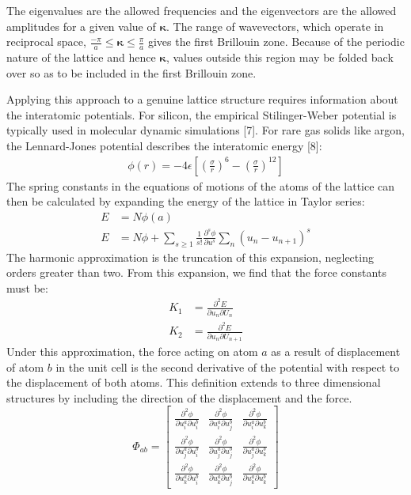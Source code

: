 \documentclass{article}
\numberwithin{equation}{section}
\begin{document}
The eigenvalues are the allowed frequencies and the eigenvectors are the allowed amplitudes for a given value of $\pmb{\kappa}$. The range of wavevectors, which operate in reciprocal space,  $\frac{-\pi}{a}\leq \pmb{\kappa}\leq\frac{\pi}{a}$ gives the first Brillouin zone. Because of the periodic nature of the lattice and hence $\pmb{\kappa}$, values outside this region may be folded back over so as to be included in the first Brillouin zone.

Applying this approach to a genuine lattice structure requires information about the interatomic potentials. For silicon, the empirical Stilinger-Weber potential is typically used in molecular dynamic simulations [7]. For rare gas solids like argon, the Lennard-Jones potential describes the interatomic energy [8]:
\begin{align*}
	\phi(r)=-4\epsilon[(\frac{\sigma}{r})^6-(\frac{\sigma}{r})^{12}]	
\end{align*}
The spring constants in the equations of motions of the atoms of the lattice can then be calculated by expanding the energy of the lattice in Taylor series:
\begin{align*}
	E&=N\phi(a)\\
	E&=N\phi+\sum_{s\geq1}\frac{1}{s!}\frac{\partial^s\phi}{\partial u^s}\sum_n(u_n-u_{n+1})^s
\end{align*}
The harmonic approximation is the truncation of this expansion, neglecting orders greater than two. From this expansion, we find that the force constants must be:
\begin{align*}
	K_1&=\frac{\partial^2 E}{\partial u_n\partial U_{n}}\\
	K_2&=\frac{\partial^2 E}{\partial u_n\partial U_{n+1}}
\end{align*}
Under this approximation, the force acting on atom $a$ as a result of displacement of atom $b$ in the unit cell is the second derivative of the potential with respect to the displacement of both atoms. This definition extends to three dimensional structures by including the direction of the displacement and the force.
\[ 
\Phi_{ab}=
\begin{bmatrix}
  \frac{\partial^2 \phi}{\partial u^a_i\partial u^b_i} & \frac{\partial^2 \phi}{\partial u^a_i\partial u^b_j} &\frac{\partial^2 \phi}{\partial u^a_i\partial u^b_k}\\
  \frac{\partial^2 \phi}{\partial u^a_j\partial u^b_i} & \frac{\partial^2 \phi}{\partial u^a_j\partial u^b_j} &\frac{\partial^2 \phi}{\partial u^a_j\partial u^b_k}\\
\frac{\partial^2 \phi}{\partial u^a_k\partial u^b_i} & \frac{\partial^2 \phi}{\partial u^a_k\partial u^b_j} &\frac{\partial^2 \phi}{\partial u^a_k\partial u^b_k}
 \end{bmatrix}
\]
\end{document}
